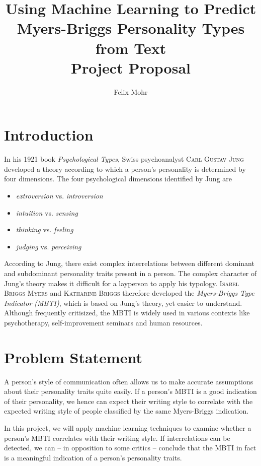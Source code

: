 \documentclass[12pt]{elsarticle}
\begin{document}
\begin{frontmatter}
\title{Using Machine Learning to Predict Myers-Briggs Personality Types from Text \\
\small Project Proposal}
\author{Felix Mohr}
\address{Karlsruhe, Germany}


\end{frontmatter}



\section{Introduction}
In his 1921 book \textit{Psychological Types}, Swiss psychoanalyst \textsc{Carl Gustav Jung} developed a theory according to which a person's personality is determined by four dimensions. The four psychological dimensions identified by Jung are
\begin{itemize}
\item \textit{extroversion} vs. \textit{introversion}
\item \textit{intuition} vs. \textit{sensing}
\item \textit{thinking} vs. \textit{feeling}
\item \textit{judging} vs. \textit{perceiving}
\end{itemize}
According to Jung, there exist complex interrelations between different dominant and subdominant personality traits present in a person. The complex character of Jung's theory makes it difficult for a layperson to apply his typology. \textsc{Isabel Briggs Myers} and \textsc{Katharine Briggs}  therefore developed the \textit{Myers-Briggs Type Indicator (MBTI)}, which is based on Jung's theory, yet easier to understand. Although frequently critisized, the MBTI is widely used in various contexts like psychotherapy, self-improvement seminars and human resources.



\section{Problem Statement}
A person's style of communication often allows us to make accurate assumptions about their personality traits quite easily. If a person's MBTI is a good indication of their personality, we hence can expect their writing style to correlate with the expected writing style of people classified by the same Myers-Briggs indication. 


In this project, we will apply machine learning techniques to examine whether a person's MBTI correlates with their writing style. If interrelations can be detected, we can -- in opposition to some critics -- conclude that the MBTI in fact is a meaningful indication of a person's personality traits. 
\end{document}
